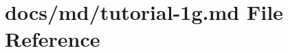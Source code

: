 \hypertarget{tutorial-1g_8md}{}\section{docs/md/tutorial-\/1g.md File Reference}
\label{tutorial-1g_8md}
